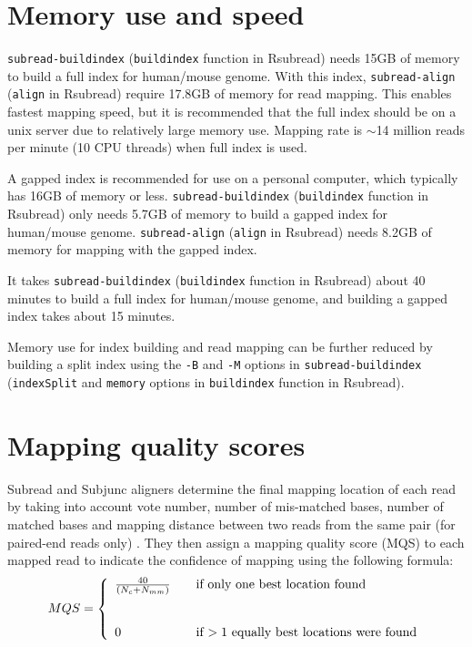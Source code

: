 \documentclass[12pt]{report}
\newcommand{\code}[1]{{\small\texttt{#1}}}
\newcommand{\Subread}{\textsf{Subread}}
\newcommand{\Subjunc}{\textsf{Subjunc}}
\newcommand{\Rsubread}{\textsf{Rsubread}}
\begin{document}
\section{Memory use and speed}
\label{sec:memoryspeed}

\code{subread-buildindex} (\code{buildindex} function in \Rsubread) needs 15GB of memory to build a full index for human/mouse genome. 
With this index, \code{subread-align} (\code{align} in \Rsubread) require 17.8GB of memory for read mapping.
This enables fastest mapping speed, but it is recommended that the full index should be on a unix server due to relatively large memory use.
Mapping rate is $\sim$14 million reads per minute (10 CPU threads) when full index is used.

A gapped index is recommended for use on a personal computer, which typically has 16GB of memory or less. 
\code{subread-buildindex} (\code{buildindex} function in \Rsubread) only needs 5.7GB of memory to build a gapped index for human/mouse genome. 
\code{subread-align} (\code{align} in \Rsubread) needs 8.2GB of memory for mapping with the gapped index.

It takes \code{subread-buildindex} (\code{buildindex} function in \Rsubread) about 40 minutes to build a full index for human/mouse genome, and building a gapped index takes about 15 minutes.

Memory use for index building and read mapping can be further reduced by building a split index using the \code{-B} and \code{-M} options in \code{subread-buildindex} (\code{indexSplit} and \code{memory} options in \code{buildindex} function in \Rsubread).


\section{Mapping quality scores}

{\Subread} and {\Subjunc} aligners determine the final mapping location of each read by taking into account vote number, number of mis-matched bases, number of matched bases and mapping distance between two reads from the same pair (for paired-end reads only) .
They then assign a mapping quality score (MQS) to each mapped read to indicate the confidence of mapping using the following formula:\\

\[ MQS = \left\{
\begin{array}{l l}
\frac{40}{(N_c + N_{mm})} & \quad \text{if only one best location found}\\
& \\
& \\
0 & \quad \text{if $>1$ equally best locations were found}\\
\end{array} \right.\] \\
\end{document}
